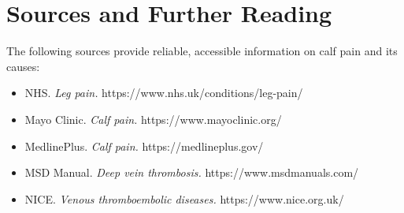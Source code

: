 \section*{Sources and Further Reading}
The following sources provide reliable, accessible information on calf pain and its causes:
\begin{itemize}
    \item NHS. \textit{Leg pain.} https://www.nhs.uk/conditions/leg-pain/
    \item Mayo Clinic. \textit{Calf pain.} https://www.mayoclinic.org/
    \item MedlinePlus. \textit{Calf pain.} https://medlineplus.gov/
    \item MSD Manual. \textit{Deep vein thrombosis.} https://www.msdmanuals.com/
    \item NICE. \textit{Venous thromboembolic diseases.} https://www.nice.org.uk/
\end{itemize}
